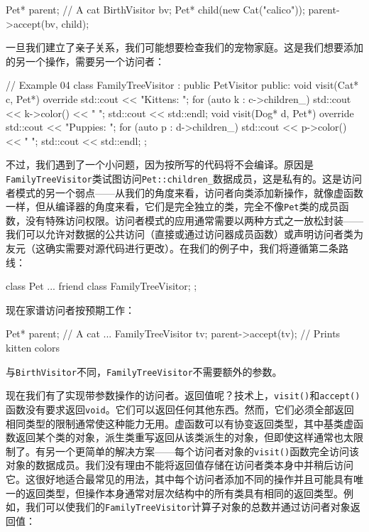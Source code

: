 \begin{code}
Pet* parent; // A cat
BirthVisitor bv;
Pet* child(new Cat("calico"));
parent->accept(bv, child);
\end{code}

一旦我们建立了亲子关系，我们可能想要检查我们的宠物家庭。这是我们想要添加的另一个操作，需要另一个访问者：

\begin{code}
// Example 04
class FamilyTreeVisitor : public PetVisitor {
  public:
  void visit(Cat* c, Pet*) override {
    std::cout << "Kittens: ";
    for (auto k : c->children_) {
      std::cout << k->color() << " ";
    }
    std::cout << std::endl;
  }
  void visit(Dog* d, Pet*) override {
    std::cout << "Puppies: ";
    for (auto p : d->children_) {
      std::cout << p->color() << " ";
    }
    std::cout << std::endl;
  }
};
\end{code}

不过，我们遇到了一个小问题，因为按所写的代码将不会编译。原因是\texttt{FamilyTreeVisitor}类试图访问\texttt{Pet::children\_}数据成员，这是私有的。这是访问者模式的另一个弱点——从我们的角度来看，访问者向类添加新操作，就像虚函数一样，但从编译器的角度来看，它们是完全独立的类，完全不像\texttt{Pet}类的成员函数，没有特殊访问权限。访问者模式的应用通常需要以两种方式之一放松封装——我们可以允许对数据的公共访问（直接或通过访问器成员函数）或声明访问者类为友元（这确实需要对源代码进行更改）。在我们的例子中，我们将遵循第二条路线：

\begin{code}
class Pet {
  ...
  friend class FamilyTreeVisitor;
};
\end{code}

现在家谱访问者按预期工作：

\begin{code}
Pet* parent; // A cat
...
FamilyTreeVisitor tv;
parent->accept(tv); // Prints kitten colors
\end{code}

与\texttt{BirthVisitor}不同，\texttt{FamilyTreeVisitor}不需要额外的参数。

现在我们有了实现带参数操作的访问者。返回值呢？技术上，\texttt{visit()}和\texttt{accept()}函数没有要求返回\texttt{void}。它们可以返回任何其他东西。然而，它们必须全部返回相同类型的限制通常使这种能力无用。虚函数可以有协变返回类型，其中基类虚函数返回某个类的对象，派生类重写返回从该类派生的对象，但即使这样通常也太限制了。有另一个更简单的解决方案——每个访问者对象的\texttt{visit()}函数完全访问该对象的数据成员。我们没有理由不能将返回值存储在访问者类本身中并稍后访问它。这很好地适合最常见的用法，其中每个访问者添加不同的操作并且可能具有唯一的返回类型，但操作本身通常对层次结构中的所有类具有相同的返回类型。例如，我们可以使我们的\texttt{FamilyTreeVisitor}计算子对象的总数并通过访问者对象返回值：

